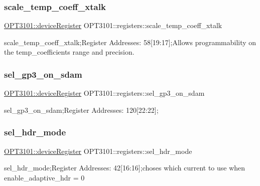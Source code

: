 \subsubsection{\texorpdfstring{scale\+\_\+temp\+\_\+coeff\+\_\+xtalk}{scale\_temp\_coeff\_xtalk}}
{\footnotesize\ttfamily \mbox{\hyperlink{class_o_p_t3101_1_1device_register}{O\+P\+T3101\+::device\+Register}} O\+P\+T3101\+::registers\+::scale\+\_\+temp\+\_\+coeff\+\_\+xtalk}



scale\+\_\+temp\+\_\+coeff\+\_\+xtalk;Register Addresses\+: 58\mbox{[}19\+:17\mbox{]};Allows programmability on the temp\+\_\+coefficients range and precision. 

\mbox{\label{class_o_p_t3101_1_1registers_a2c3f2cecfca84f9cc11dde779753bb17}} 
\subsubsection{\texorpdfstring{sel\+\_\+gp3\+\_\+on\+\_\+sdam}{sel\_gp3\_on\_sdam}}
{\footnotesize\ttfamily \mbox{\hyperlink{class_o_p_t3101_1_1device_register}{O\+P\+T3101\+::device\+Register}} O\+P\+T3101\+::registers\+::sel\+\_\+gp3\+\_\+on\+\_\+sdam}



sel\+\_\+gp3\+\_\+on\+\_\+sdam;Register Addresses\+: 120\mbox{[}22\+:22\mbox{]}; 

\mbox{\label{class_o_p_t3101_1_1registers_a1f8f226c3e13479d0dafeb402d35d519}} 
\subsubsection{\texorpdfstring{sel\+\_\+hdr\+\_\+mode}{sel\_hdr\_mode}}
{\footnotesize\ttfamily \mbox{\hyperlink{class_o_p_t3101_1_1device_register}{O\+P\+T3101\+::device\+Register}} O\+P\+T3101\+::registers\+::sel\+\_\+hdr\+\_\+mode}



sel\+\_\+hdr\+\_\+mode;Register Addresses\+: 42\mbox{[}16\+:16\mbox{]};choses which current to use when enable\+\_\+adaptive\+\_\+hdr = \textquotesingle{}0\textquotesingle{} 

